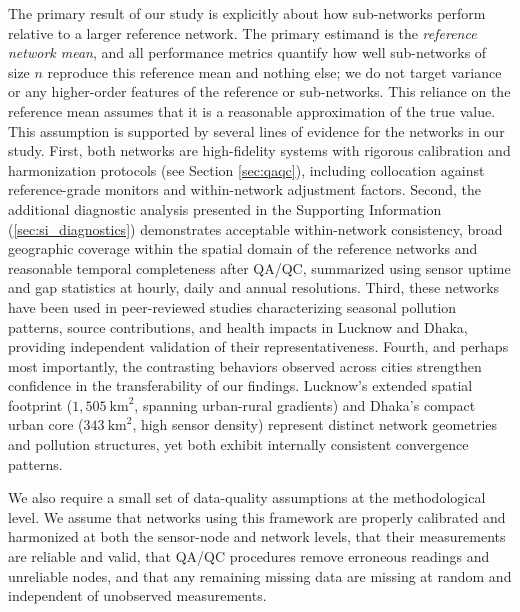 \documentclass[12pt]{article}
\theoremstyle{remark}
\begin{document}
The primary result of our study is explicitly about how sub-networks perform relative to a larger reference network. The primary estimand is the \emph{reference network mean}, and all performance metrics quantify how well sub-networks of size $n$ reproduce this reference mean and nothing else; we do not target variance or any higher-order features of the reference or sub-networks. This reliance on the reference mean assumes that it is a reasonable approximation of the true value. This assumption is supported by several lines of evidence for the networks in our study. First, both networks are high-fidelity systems with rigorous calibration and harmonization protocols (see Section \ref{sec:qaqc}), including collocation against reference-grade monitors and within-network adjustment factors.\supercite{jain_hybrid_2024,zaman_comparison_2025} Second, the additional diagnostic analysis presented in the Supporting Information (\ref{sec:si_diagnostics}) demonstrates acceptable within-network consistency, broad geographic coverage within the spatial domain of the reference networks and reasonable temporal completeness after QA/QC, summarized using sensor uptime and gap statistics at hourly, daily and annual resolutions. Third, these networks have been used in peer-reviewed studies characterizing seasonal pollution patterns, source contributions, and health impacts in Lucknow and Dhaka, providing independent validation of their representativeness.\supercite{madhwal_evaluation_2024,jain_hybrid_2024,zaman_comparison_2025} Fourth, and perhaps most importantly, the contrasting behaviors observed across cities strengthen confidence in the transferability of our findings. Lucknow's extended spatial footprint ($1{,}505~\mathrm{km}^2$, spanning urban-rural gradients) and Dhaka's compact urban core ($343~\mathrm{km}^2$, high sensor density) represent distinct network geometries and pollution structures, yet both exhibit internally consistent convergence patterns. 

We also require a small set of data-quality assumptions at the methodological level. We assume that networks using this framework are properly calibrated and harmonized at both the sensor-node and network levels, that their measurements are reliable and valid, that QA/QC procedures remove erroneous readings and unreliable nodes, and that any remaining missing data are missing at random and independent of unobserved measurements.
\end{document}

